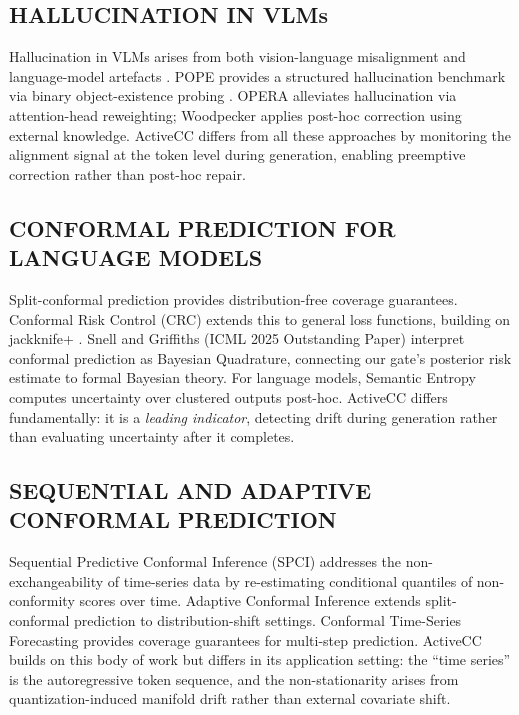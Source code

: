 \documentclass{ieeetmlcn}
\begin{document}
\subsection{HALLUCINATION IN VLMs}
Hallucination in VLMs arises from both vision-language misalignment and language-model artefacts \cite{huang2025survey}. POPE provides a structured hallucination benchmark via binary object-existence probing \cite{li2023pope}. OPERA \cite{huang2023opera} alleviates hallucination via attention-head reweighting; Woodpecker applies post-hoc correction using external knowledge. ActiveCC differs from all these approaches by monitoring the alignment signal at the token level during generation, enabling preemptive correction rather than post-hoc repair.

\subsection{CONFORMAL PREDICTION FOR LANGUAGE MODELS}
Split-conformal prediction  provides
distribution-free coverage guarantees. Conformal Risk Control (CRC)
\cite{angelopoulos2024conformal} extends this to general loss functions,
building on jackknife+ . Snell and Griffiths
\cite{pmlr-v267-snell25a} (ICML 2025 Outstanding Paper) interpret
conformal prediction as Bayesian Quadrature, connecting our gate's
posterior risk estimate to formal Bayesian theory. For language models,
Semantic Entropy  computes uncertainty over
clustered outputs post-hoc. ActiveCC differs fundamentally: it is a
\emph{leading indicator}, detecting drift during generation rather than
evaluating uncertainty after it completes.

\subsection{SEQUENTIAL AND ADAPTIVE CONFORMAL PREDICTION}
Sequential Predictive Conformal Inference (SPCI) \cite{pmlr-v202-xu23r}
addresses the non-exchangeability of time-series data by re-estimating
conditional quantiles of non-conformity scores over time. Adaptive
Conformal Inference \cite{gibbs2021adaptive} extends split-conformal
prediction to distribution-shift settings. Conformal Time-Series
Forecasting  provides coverage
guarantees for multi-step prediction. ActiveCC builds on this body of
work but differs in its application setting: the ``time series'' is the
autoregressive token sequence, and the non-stationarity arises from
quantization-induced manifold drift rather than external covariate
shift.
\end{document}
